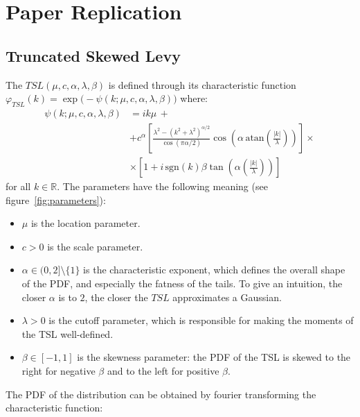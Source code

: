 \documentclass[11pt]{article}
\newcommand{\atan}{\,\mathrm{atan}}
\newcommand{\sgn}{\,\mathrm{sgn}}
\begin{document}
    \section{Paper Replication}
    \label{sec:replication}
        \subsection{Truncated Skewed Levy}\label{subsec:truncated-skewed-levy}
    The $TSL(\mu, c, \alpha, \lambda, \beta)$ is defined through  its characteristic function $\varphi_{TSL}(k) = \exp\big(-\psi(k; \mu, c, \alpha, \lambda, \beta)\big)$ where:
        \begin{equation}
            \begin{aligned}
                \psi(k; \mu, c, \alpha, \lambda, \beta) &= ik\mu \,+\\
                                                    & + c^{\alpha}\left[\frac{\lambda^2-(k^2+\lambda^2)^{\alpha/2}}{\cos(\pi \alpha/2)}\cos\left(\alpha \atan \left(\frac{|k|}{\lambda}\right)\right)\right] \times \\
                                                    & \times \left[ 1+ i \sgn(k) \beta \tan \left(\alpha\left(\frac{|k|}{\lambda}\right)\right) \right]
            \end{aligned}\label{eq:char_func}
        \end{equation}
        for all $k \in \mathbb{R}$.
        The parameters have the following meaning (see figure~\ref{fig:parameters}):
        \begin{itemize}
            \item $\mu$ is the location parameter.
            \item $c >0$ is the scale parameter.
            \item $\alpha \in (0,2] \setminus\{1\} $ is the characteristic exponent, which defines the overall shape of the PDF, and especially the fatness of the tails.
            To give an intuition, the closer $\alpha$ is to $2$, the closer the $TSL$ approximates a Gaussian.
            \item $\lambda > 0$ is the cutoff parameter, which is responsible for making the moments of the TSL well-defined.
            \item $\beta \in [-1, 1]$ is the skewness parameter: the PDF of the TSL is skewed to the right for negative $\beta$ and to the left for positive $\beta$.
        \end{itemize}
        The PDF of the distribution can be obtained by fourier transforming the characteristic function:
\end{document}
